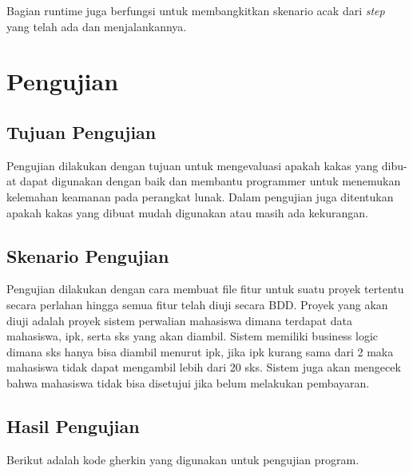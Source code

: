 Bagian runtime juga berfungsi untuk membangkitkan skenario acak dari \emph{step} yang telah ada
dan menjalankannya.

\section{Pengujian}

\subsection{Tujuan Pengujian}

Pengujian dilakukan dengan tujuan untuk mengevaluasi apakah kakas yang dibu- at dapat digunakan dengan baik dan membantu programmer untuk menemukan kelemahan keamanan pada perangkat lunak. Dalam pengujian juga ditentukan apakah kakas yang dibuat mudah digunakan atau masih ada kekurangan.


\subsection{Skenario Pengujian}

Pengujian dilakukan dengan cara membuat file fitur untuk suatu proyek tertentu secara perlahan hingga semua fitur telah diuji secara BDD. Proyek yang akan diuji adalah proyek sistem perwalian mahasiswa dimana terdapat data mahasiswa, ipk, serta sks yang akan diambil. Sistem memiliki business logic dimana sks hanya bisa diambil menurut ipk, jika ipk kurang sama dari 2 maka mahasiswa tidak dapat mengambil lebih dari 20 sks. Sistem juga akan mengecek bahwa mahasiswa tidak bisa disetujui jika belum melakukan pembayaran.

\subsection{Hasil Pengujian}

Berikut adalah kode gherkin yang digunakan untuk pengujian program.

